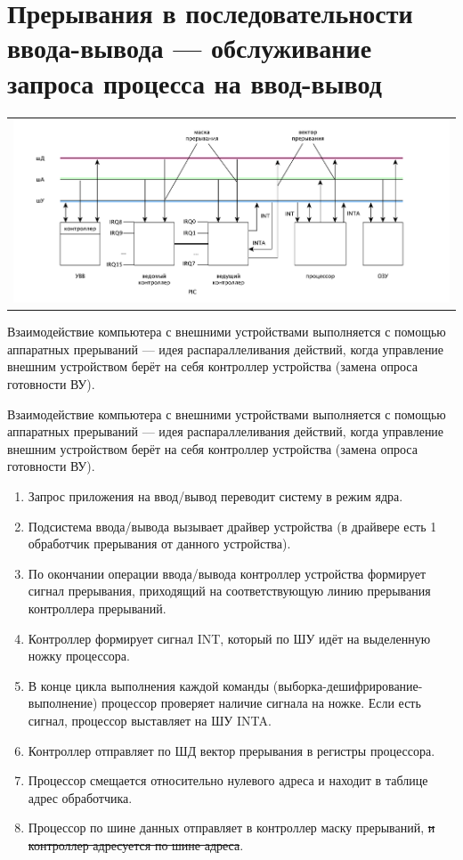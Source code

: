 \section{Прерывания в последовательности ввода-вывода --- обслуживание запроса процесса на ввод-вывод}

\begin{table}[h!]
  \centering
  \begin{tabular}{p{1\linewidth}}
    \centering
    \includegraphics[width=0.9\linewidth]{./images/buses.pdf}
  \end{tabular}
\end{table}

Взаимодействие компьютера с внешними устройствами выполняется с помощью аппаратных прерываний --- идея распараллеливания действий, когда управление внешним устройством берёт на себя контроллер устройства (замена опроса готовности ВУ).

Взаимодействие компьютера с внешними устройствами выполняется с помощью аппаратных прерываний --- идея распараллеливания действий, когда управление внешним устройством берёт на себя контроллер устройства (замена опроса готовности ВУ).

\begin{enumerate}
  \item Запрос приложения на ввод/вывод переводит систему в режим ядра.
  \item Подсистема ввода/вывода вызывает драйвер устройства (в драйвере есть 1 обработчик прерывания от данного устройства).
  \item По окончании операции ввода/вывода контроллер устройства формирует сигнал прерывания, приходящий на соответствующую линию прерывания контроллера прерываний.
  \item Контроллер формирует сигнал INT, который по ШУ идёт на выделенную ножку процессора.
  \item В конце цикла выполнения каждой команды (выборка-дешифрирование-выполнение) процессор проверяет наличие сигнала на ножке. Если есть сигнал, процессор выставляет на ШУ INTA.
  \item Контроллер отправляет по ШД вектор прерывания в регистры процессора.
  \item Процессор смещается относительно нулевого адреса и находит в таблице адрес обработчика.
  \item Процессор по шине данных отправляет в контроллер маску прерываний, \sout{и контроллер адресуется по шине адреса}. 
\end{enumerate}

